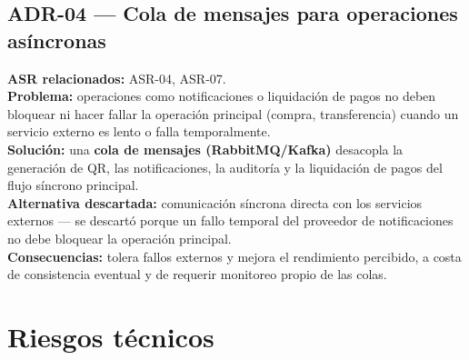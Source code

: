 \documentclass[11pt,a4paper]{article}
\begin{document}
\subsection*{ADR-04 --- Cola de mensajes para operaciones asíncronas}
\textbf{ASR relacionados:} ASR-04, ASR-07.\\
\textbf{Problema:} operaciones como notificaciones o liquidación de pagos no deben bloquear ni
hacer fallar la operación principal (compra, transferencia) cuando un servicio externo es lento o
falla temporalmente.\\
\textbf{Solución:} una \textbf{cola de mensajes (RabbitMQ/Kafka)} desacopla la generación de QR,
las notificaciones, la auditoría y la liquidación de pagos del flujo síncrono principal.\\
\textbf{Alternativa descartada:} comunicación síncrona directa con los servicios externos — se
descartó porque un fallo temporal del proveedor de notificaciones no debe bloquear la operación
principal.\\
\textbf{Consecuencias:} tolera fallos externos y mejora el rendimiento percibido, a costa de
consistencia eventual y de requerir monitoreo propio de las colas.

\section{Riesgos técnicos}
\label{sec:riesgos}
\end{document}
